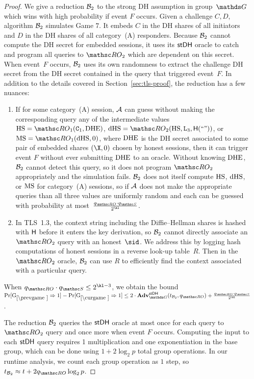 \begin{proof}
	We give a reduction $\mathcal{B}_2$ to the strong DH assumption in group~$\group$ which wins with high probability if event $F$ occurs. 
	Given a challenge $C,D$, algorithm $\mathcal{B}_2$ simulates Game $7$. It embeds $C$ in the DH shares of all initiators and $D$ in the DH shares of all category~(A) responders. 
	Because $\mathcal{B}_2$ cannot compute the DH secret for embedded sessions, it uses its $\mathsf{stDH}$ oracle to catch and program all queries to $\RO_2$ which are dependent on this secret. When event~$F$ occurs, $\mathcal{B}_2$ uses its own randomness to extract the challenge DH secret from the DH secret contained in the query that triggered event~$F$. 
	In addition to the details covered in Section~\ref{sec:tls-proof}, the reduction has a few nuances:
	\begin{enumerate}
		\item If for some category~(A) session, $\mathcal{A}$ can guess without making the corresponding query any of the intermediate values $\HS = \RO_1(\constant[1],\DHE)$, $\dHS = \RO_2(\HS,\inputlabel[3],\Hash(``"))$, or $\MS = \RO_1(\dHS,0)$, where $\mathrm{DHE}$ is the DH secret associated to some pair of embedded shares $(\X,\Y)$ chosen by honest sessions, then it can trigger event $F$ without ever submitting $\mathrm{DHE}$ to an oracle.
		Without knowing $\mathrm{DHE}$, $\mathcal{B}_2$ cannot detect this query, so it does not program $\RO_2$ appropriately and the simulation fails.
		$\mathcal{B}_2$ does not itself compute $\mathrm{HS}$, $\mathrm{dHS}$, or $\mathrm{MS}$ for category~(A) sessions, so if $\mathcal{A}$ does not make the appropriate queries than all three values are uniformly random and each can be guessed with probability at most~$\frac{\qRO \cdot \qSend}{2^{\kl}}$.  
		
		\item In TLS~1.3, the context string including the Diffie--Hellman shares is hashed with $\mathsf{H}$ before it enters the key derivation, so $\mathcal{B}_2$ cannot directly associate an $\RO_2$ query with an honest~$\sid$.
		We address this by logging hash computations of honest sessions in a reverse look-up table~$R$.
		Then in the $\RO_2$ oracle, $\mathcal{B}_2$ can use $R$ to efficiently find the context associated with a particular query.
		
	\end{enumerate}
	When $\qRO \cdot \qSend \leq 2^{\kl - 3}$, we obtain the bound
	$\Pr[\prevGm*\Rightarrow 1 ] - \Pr[\curGm*\Rightarrow 1] \leq 2\cdot \Adv^{\strongDH}_{\group}(t_{\advB_2},\qRO) +\frac{\qRO \cdot \qSend}{2^{\kl}}$.
	
	The reduction $\mathcal{B}_2$ queries the $\mathsf{stDH}$ oracle at most once for each query to $\RO_2$ query and once more when event $F$ occurs.
	Computing the input to each $\mathsf{stDH}$ query requires 1 multiplication and one exponentiation in the base group, which can be done using $1+2\log_2 p$ total group operations. In our runtime analysis, we count each group operation as $1$ step, so $t_{\advB_2} \approx t + 2 \qRO\log_2 p$.
	

\end{proof}
